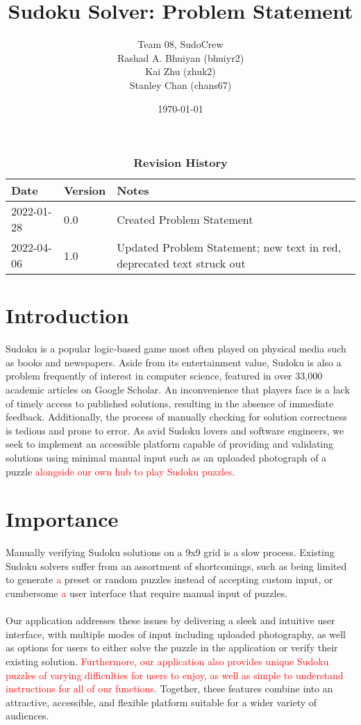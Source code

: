 \documentclass[11pt]{article}
\title{Sudoku Solver: Problem Statement}
\author{Team 08, SudoCrew
		\\ Rashad A. Bhuiyan (bhuiyr2)
		\\ Kai Zhu (zhuk2)
		\\ Stanley Chan (chans67)
}
\date{\today}
\begin{document}
\maketitle

\tableofcontents
\listoftables

\newpage

\begin{table}[h]
\caption{\bf Revision History}
\begin{tabularx}{\textwidth}{p{3cm}p{2cm}X}
\toprule {\bf Date} & {\bf Version} & {\bf Notes}\\
\midrule
2022-01-28 & 0.0 & Created Problem Statement\\
2022-04-06 & 1.0 & Updated Problem Statement; new text in red, deprecated text struck out\\
\bottomrule
\end{tabularx}
\end{table}

\newpage


\section{Introduction}
Sudoku is a popular logic-based game most often played on physical media such as books and
newspapers. Aside from its entertainment value, Sudoku is also a problem frequently of interest in computer science, featured in over 33,000 academic articles on Google Scholar. An inconvenience that players face is a lack of timely access to published solutions, resulting in the absence of immediate feedback. Additionally, the process of manually checking for solution correctness is tedious and prone to error. As avid Sudoku lovers and software engineers, we seek to implement an accessible platform capable of providing and validating solutions using minimal manual input such as an uploaded photograph of a puzzle \textcolor{red}{alongside our own hub to play Sudoku puzzles}.


\section{Importance}
Manually verifying Sudoku solutions on a 9x9 grid is a slow process. Existing Sudoku solvers suffer from an assortment of shortcomings, such as being limited to generate \textcolor{red}{a} preset or random puzzles instead of accepting custom input, or cumbersome \textcolor{red}{a} user interface that require manual input of puzzles.
\\
\\
Our application addresses these issues by delivering a sleek and intuitive user interface, with multiple modes of input including uploaded photography, as well as options for users to either solve the puzzle in the application or verify their existing solution. \textcolor{red}{Furthermore, our application also provides unique Sudoku puzzles of varying difficulties for users to enjoy, as well as simple to understand instructions for all of our functions.} Together, these features combine into an attractive, accessible, and flexible platform suitable for a wider variety of audiences.
\end{document}

